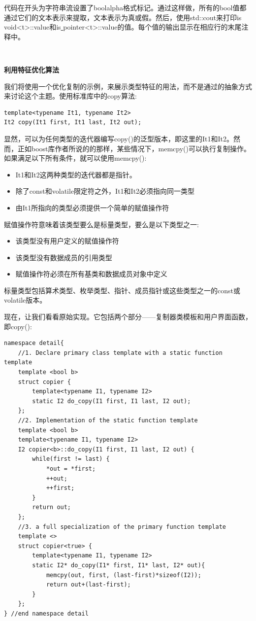 代码在开头为字符串流设置了boolalpha格式标记。通过这样做，所有的bool值都通过它们的文本表示来提取，文本表示为真或假。然后，使用std::cout来打印is\underline{ }void<t>::value和is\underline{ }pointer<t>::value的值。每个值的输出显示在相应行的末尾注释中。 \par

\noindent\textbf{}\ \par
\textbf{利用特征优化算法} \ \par
我们将使用一个优化复制的示例，来展示类型特征的用法，而不是通过的抽象方式来讨论这个主题。使用标准库中的copy算法: \par

\begin{lstlisting}[caption={}]
template<typename It1, typename It2>
It2 copy(It1 first, It1 last, It2 out);
\end{lstlisting}

显然，可以为任何类型的迭代器编写copy()的泛型版本，即这里的It1和It2。然而，正如boost库作者所说的的那样，某些情况下，memcpy()可以执行复制操作。如果满足以下所有条件，就可以使用memcpy():\par

\begin{itemize}
	\item It1和It2这两种类型的迭代器都是指针。
	\item 除了const和volatile限定符之外，It1和It2必须指向同一类型
	\item 由It1所指向的类型必须提供一个简单的赋值操作符
\end{itemize}

赋值操作符意味着该类型要么是标量类型，要么是以下类型之一: \par

\begin{itemize}
	\item 该类型没有用户定义的赋值操作符
	\item 该类型没有数据成员的引用类型
	\item 赋值操作符必须在所有基类和数据成员对象中定义
\end{itemize}

标量类型包括算术类型、枚举类型、指针、成员指针或这些类型之一的const或volatile版本。 \par
现在，让我们看看原始实现。它包括两个部分——复制器类模板和用户界面函数，即copy(): \par

\begin{lstlisting}[caption={}]
namespace detail{
	//1. Declare primary class template with a static function template
	template <bool b>
	struct copier {
		template<typename I1, typename I2>
		static I2 do_copy(I1 first, I1 last, I2 out);
	};
	//2. Implementation of the static function template
	template <bool b>
	template<typename I1, typename I2>
	I2 copier<b>::do_copy(I1 first, I1 last, I2 out) {
		while(first != last) {
			*out = *first;
			++out;
			++first;
		}
		return out;
	};
	//3. a full specialization of the primary function template
	template <>
	struct copier<true> {
		template<typename I1, typename I2>
		static I2* do_copy(I1* first, I1* last, I2* out){
			memcpy(out, first, (last-first)*sizeof(I2));
			return out+(last-first);
		}
	};
} //end namespace detail
\end{lstlisting}

